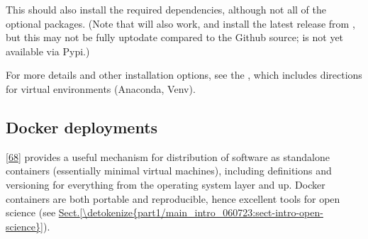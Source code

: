 \documentclass[letterpaper,table,10pt,english]{jupyterBook}
\begin{document}
\begin{sphinxVerbatim}[commandchars=\\\{\}]
  
  

\end{sphinxVerbatim}

\sphinxAtStartPar
This should also install the required dependencies, although not all of the optional packages. (Note that  will also work, and install the latest release from , but this may not be fully up\sphinxhyphen{}to\sphinxhyphen{}date compared to the Github source;  is not yet available via Pypi.)

\sphinxAtStartPar
For more details and other installation options, see the , which includes directions for virtual environments (Anaconda, Venv).


\subsection{Docker deployments}
\label{\detokenize{part1/platform_intro_070723:docker-deployments}}\label{\detokenize{part1/platform_intro_070723:sect-platform-docker}}
\sphinxAtStartPar
{} {[}\hyperlink{cite.backmatter/bibliography:id578}{68}{]} provides a useful mechanism for distribution of software as stand\sphinxhyphen{}alone containers (essentially minimal virtual machines), including definitions and versioning for everything from the operating system layer and up. Docker containers are both portable and reproducible, hence excellent tools for open science (see \hyperref[\detokenize{part1/main_intro_060723:sect-intro-open-science}]{Sect.\@ \ref{\detokenize{part1/main_intro_060723:sect-intro-open-science}}}).
\end{document}

